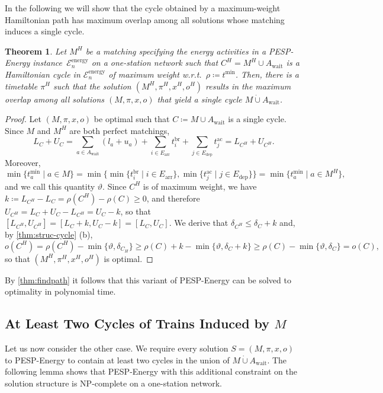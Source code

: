 \documentclass[11pt,a4paper]{article}
\newcommand{\dotcup}{\mathbin{\dot\cup}}
\newcommand{\arr}{\mathrm{arr}}
\newcommand{\dep}{\mathrm{dep}}
\newcommand{\wait}{\mathrm{wait}}
\newcommand{\energy}{\mathrm{energy}}
\newcommand{\energyact}{M}               %
\newcommand{\ac}{\mathrm{ac}}
\newcommand{\br}{\mathrm{br}}
\newcommand{\pespenergy}{PESP-Energy\xspace}
\newcommand{\osn}{one-station network\xspace}
\newcommand{\w}{\rho} %
\newtheorem{theorem}{Theorem}[section]
\theoremstyle{definition}
\theoremstyle{remark}
\begin{document}
In the following we will show that the cycle obtained by a maximum-weight Hamiltonian path has maximum overlap among all solutions whose matching induces a single cycle.

\begin{theorem}
    \label{thm:pesp-energy-single-cycle}
	Let $\energyact^H$ be a matching specifying the energy activities in a \pespenergy instance~$\mathcal E_n^\energy$ on a one-station network such that $C^H = \energyact^H \cup A_{\wait}$ is a Hamiltonian cycle in $\mathcal E_n^{\energy}$ of maximum weight w.r.t.\ $\w \coloneqq t^{\min}$.  Then, there is a timetable $\pi^H$ such that the solution $(\energyact^H, \pi^H, x^H, o^H)$ results in the maximum overlap among all solutions $(\energyact, \pi, x, o)$ that yield a single cycle $\energyact \dotcup A_{\wait}$.
\end{theorem}

\begin{proof}
    Let $(\energyact, \pi, x, o)$ be optimal such that $C \coloneqq \energyact \cup A_\wait$ is a single cycle. Since $\energyact$ and $\energyact^H$ are both perfect matchings,
    $$L_C + U_C = \sum_{a \in A_\wait} (l_a + u_a) + \sum_{i \in E_{\arr}} t_i^\br + \sum_{j \in E_{\dep}} t_j^\ac = L_{C^H} + U_{C^H}.$$
    Moreover, 
    $$ \min\{t_a^{\min} \mid a \in %
    \energyact\}  = \min\{ \min\{ t_i^\br \mid i \in E_{\arr}\},  \min\{t_j^\ac \mid j \in E_{\dep}\}\} = \min\{t_a^{\min} \mid a \in %
    \energyact^H\},$$
    and we call this quantity $\vartheta$.
    Since $C^H$ is of maximum weight, we have $k \coloneqq L_{C^H} - L_C = \w(C^H) - \w(C) \geq 0$, and therefore $U_{C^H} = L_C + U_C - L_{C^H} = U_C - k$, so that $[L_{C^H}, U_{C^H}] = [L_C+k, U_C-k] = [L_C, U_C]$. We derive that $\delta_{C^H} \leq \delta_C + k$ and, by \cref{thm:struc-cycle} (b), $$o(C^H) = \w(C^H) - \min\{\vartheta, \delta_{C_H}\} \geq \w(C) + k - \min\{\vartheta, \delta_C + k\} \geq \w(C) - \min\{\vartheta, \delta_C\} = o(C),$$
    so that $(\energyact^H, \pi^H, x^H, o^H)$ is optimal.
\end{proof}


By \cref{thm:findpath} it follows that this variant of \pespenergy can be solved to optimality in polynomial time.

\subsection{At Least Two Cycles of Trains Induced by $\energyact$}

Let us now consider the other case. We require every solution $S=(\energyact, \pi, x, o)$ to \pespenergy to contain at least two cycles in the union of $\energyact \dotcup A_{\wait}$. The following lemma shows that \pespenergy with this additional constraint on the solution structure is NP-complete on a \osn. 
\end{document}
